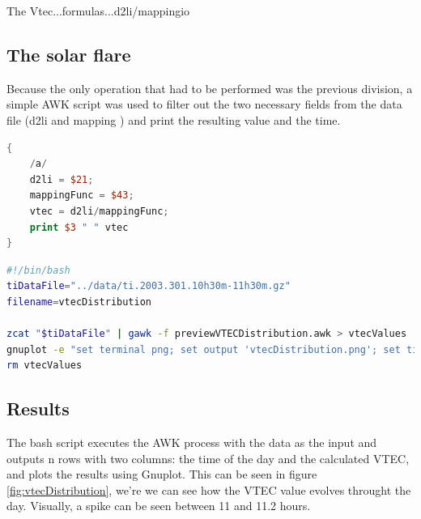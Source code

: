 The Vtec...formulas...d2li/mappingio


\subsection{The solar flare}

Because the only operation that had to be performed was the previous division, a simple AWK script was used to filter out the two necessary fields from the data file (d2li and  mapping ) and print the resulting value and the time. 

\begin{lstlisting}[language=Awk, caption=process]
{
	/a/
	d2li = $21;
	mappingFunc = $43;
	vtec = d2li/mappingFunc;
	print $3 " " vtec
}
\end{lstlisting}

\begin{lstlisting}[language=Bash, caption=Bash script to execute the procedures]
#!/bin/bash
tiDataFile="../data/ti.2003.301.10h30m-11h30m.gz"
filename=vtecDistribution

zcat "$tiDataFile" | gawk -f previewVTECDistribution.awk > vtecValues
gnuplot -e "set terminal png; set output 'vtecDistribution.png'; set title 'VTEC Distribution'; set xlabel 'Time of the day (hours)'; set ylabel 'VTEC'; set grid; plot \"vtecValues\" using 1:2 with point"
rm vtecValues
\end{lstlisting}
\clearpage

\subsection{Results}

The bash script executes the AWK process with the data as the input and outputs n rows with two columns: the time of the day and the calculated VTEC, and plots the results using Gnuplot.
This can be seen in figure \ref{fig:vtecDistribution}, we're we can see how the VTEC value evolves throught the day. Visually, a spike can be seen between 11 and 11.2 hours.

